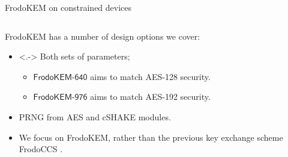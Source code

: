 \documentclass{beamer}            %
\begin{document}
\begin{frame}{FrodoKEM on constrained devices}


%
%

\begin{columns}
    \begin{column}{0.7\textwidth}
\textsf{FrodoKEM} has a number of design options we cover:

\begin{itemize}
\item<.-> Both sets of parameters; 
\begin{itemize}

\item $\textsf{FrodoKEM-640}$ aims to match AES-128 security.

\item $\textsf{FrodoKEM-976}$ aims to match AES-192 security.
\end{itemize}

\item PRNG from AES and cSHAKE modules.

\item We focus on \textsf{FrodoKEM}, rather than the previous key exchange scheme \textsf{FrodoCCS} \cite{DBLP:conf/ccs/BosCDMNNRS16}.


\end{itemize}
\end{column}
\end{columns}
\end{frame}
\end{document}
